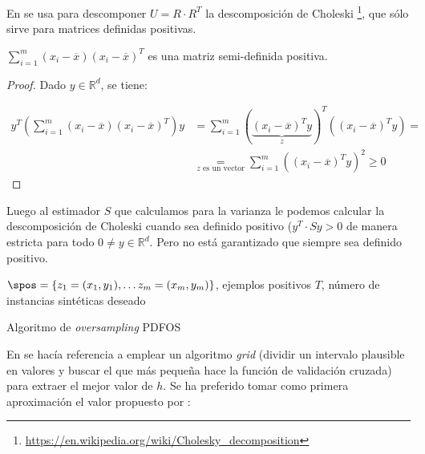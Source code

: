 En \cite{gao2014} se usa para descomponer $U = R\cdot R^T$ la descomposición de Choleski 
\footnote{\url{https://en.wikipedia.org/wiki/Cholesky_decomposition}}, que sólo sirve para matrices definidas positivas.

\begin{lemma}
 $\sum_{i=1}^m (x_i - \overline{x})(x_i - \overline{x})^T$ es una matriz semi-definida positiva.
\end{lemma}
\begin{proof}
 Dado $y \in \mathbb{R}^d$, se tiene:
 
 \begin{align*}
 y^T \left(\sum_{i=1}^m (x_i - \overline{x})(x_i - \overline{x})^T\right) y &=
 \sum_{i=1}^m ( \underbrace{(x_i - \overline{x})^T y}_z)^T ((x_i - \overline{x})^T y) = \\
 &\underset{z \textrm{ es un vector}}{=} \sum_{i=1}^m ((x_i - \overline{x})^T y)^2 \ge 0
 \end{align*}
\end{proof}

Luego al estimador $S$ que calculamos para la varianza le podemos calcular la descomposición de Choleski cuando sea 
definido positivo ($y^T \cdot S y > 0$ de manera estricta para todo $0 \neq y\in \mathbb{R}^d$. Pero no está garantizado 
que siempre sea definido positivo.

\begin{algorithm}[H]
\begin{algorithmic}[1]
  \REQUIRE $\spos = \{z_1=(x_1, y_1), \ldots z_m=(x_m, y_m)\}$, ejemplos positivos
  \REQUIRE $T$, número de instancias sintéticas deseado
  \NEWLINE
  \ENDFOR
  \NEWLINE
\end{algorithmic}
\caption{Algoritmo de \textit{oversampling} PDFOS}
\label{alg:pdfos}
\end{algorithm}


En \cite{gao2014} se hacía referencia a emplear un algoritmo \textit{grid} (dividir un intervalo plausible en valores
y buscar el que más pequeña hace la función de validación cruzada) para extraer el mejor valor de $h$. Se ha preferido
tomar como primera aproximación el valor propuesto por \citeauthor{silverman}:

